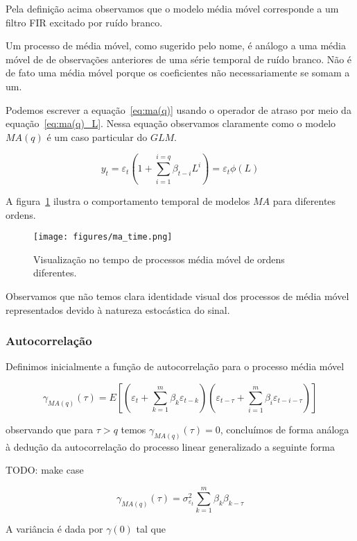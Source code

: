 Pela definição acima observamos que o modelo média móvel corresponde a um
filtro FIR excitado por ruído branco.

Um processo de média móvel, como sugerido pelo nome, é análogo a uma média
móvel de de observações anteriores de uma série temporal de ruído branco. Não
é de fato uma média móvel porque os coeficientes não necessariamente se somam a
um.

Podemos escrever a equação~\ref{eq:ma(q)} usando o operador de atraso por meio
da equação~\ref{eq:ma(q)_L}. Nessa equação observamos claramente como o modelo
$MA(q)$ é um caso particular do $GLM$.

\begin{equation}\label{eq:ma(q)_L}
    y_t = \varepsilon_t(1 + \sum_{i=1}^{i=q} \beta_{t-i} L^{i}) = \varepsilon_t \phi(L)
\end{equation}

A figura~\ref{fig:ma_time} ilustra o comportamento temporal de modelos $MA$ para
diferentes ordens.

\begin{figure}[H]
    \centering
    \texttt{[image: figures/ma\_time.png]}
    \caption{Visualização no tempo de processos média móvel de ordens
    diferentes.}
    \label{fig:ma_time}
\end{figure}

Observamos que não temos clara identidade visual dos processos de média móvel
representados devido à natureza estocástica do sinal.

\subsubsection{Autocorrelação}

Definimos inicialmente a função de autocorrelação para o processo média móvel

$$\gamma_{MA(q)}(\tau) = E\left[\left(\varepsilon_t + \sum^{m}_{k=1} \beta_k \varepsilon_{t-k}\right)\left( \varepsilon_{t-\tau} + \sum^{m}_{i=1} \beta_i \varepsilon_{t-i-\tau}\right) \right] $$

observando que para $\tau > q$ temos $\gamma_{MA(q)}(\tau) = 0$, concluímos de
forma análoga à dedução da autocorrelação do processo linear generalizado a
seguinte forma

TODO: make case

$$\gamma_{MA(q)}(\tau) = \sigma_{\varepsilon_t}^2 \sum^{m}_{k=1} \beta_k\beta_{k-\tau} $$

A variância é dada por $\gamma(0)$ tal que

